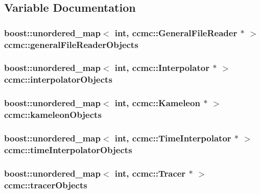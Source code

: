 \subsection{Variable Documentation}
\hypertarget{namespaceccmc_a7ba79d1acce93baeda374a43851156aa}{
\subsubsection[{general\-File\-Reader\-Objects}]{\setlength{\rightskip}{0pt plus 5cm}boost\-::unordered\-\_\-map$<$ int, {\bf ccmc\-::\-General\-File\-Reader} $\ast$ $>$ ccmc\-::general\-File\-Reader\-Objects}}\label{namespaceccmc_a7ba79d1acce93baeda374a43851156aa}
\hypertarget{namespaceccmc_a2c048d6e94d27b4ed2512ee7b3120cee}{
\subsubsection[{interpolator\-Objects}]{\setlength{\rightskip}{0pt plus 5cm}boost\-::unordered\-\_\-map$<$ int, {\bf ccmc\-::\-Interpolator} $\ast$ $>$ ccmc\-::interpolator\-Objects}}\label{namespaceccmc_a2c048d6e94d27b4ed2512ee7b3120cee}
\hypertarget{namespaceccmc_a32accee4a9d6e98c351ba973d5153bf0}{
\subsubsection[{kameleon\-Objects}]{\setlength{\rightskip}{0pt plus 5cm}boost\-::unordered\-\_\-map$<$ int, {\bf ccmc\-::\-Kameleon} $\ast$ $>$ ccmc\-::kameleon\-Objects}}\label{namespaceccmc_a32accee4a9d6e98c351ba973d5153bf0}
\hypertarget{namespaceccmc_a1d8863c8e4bddace1d180833373be257}{
\subsubsection[{time\-Interpolator\-Objects}]{\setlength{\rightskip}{0pt plus 5cm}boost\-::unordered\-\_\-map$<$ int, {\bf ccmc\-::\-Time\-Interpolator} $\ast$ $>$ ccmc\-::time\-Interpolator\-Objects}}\label{namespaceccmc_a1d8863c8e4bddace1d180833373be257}
\hypertarget{namespaceccmc_ab28d1a1a0dab8213d6468d0138d9d845}{
\subsubsection[{tracer\-Objects}]{\setlength{\rightskip}{0pt plus 5cm}boost\-::unordered\-\_\-map$<$ int, {\bf ccmc\-::\-Tracer} $\ast$ $>$ ccmc\-::tracer\-Objects}}\label{namespaceccmc_ab28d1a1a0dab8213d6468d0138d9d845}

